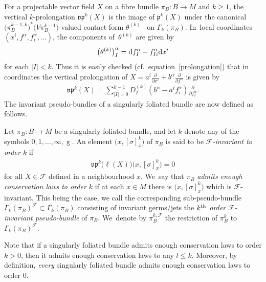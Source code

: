 \documentclass[pdftex]{sigma}
\numberwithin{equation}{section}
\def\g{\operatorname{g}}
\def\FF{{\mathcal{F}}}
\def\pf{{\mathfrak{p}}}
\def\vpf{{\mathfrak{vp}}}
\begin{document}
For a projectable vector field $X$ on a fibre bundle $\pi_{B}\colon B\rightarrow M$ and $k\geq1$, the vertical $k$-prolongation $\vpf^{k}(X)$ is the image of $\pf^{k}(X)$ under the canonical $\big(\pi_{B}^{k-1,k}\big)^{*}\big(V\pi_{B}^{k-1}\big)$-valued contact form $\theta^{(k)}$~\cite[Chapter~6.3]{saunders} on $\Gamma_{k}(\pi_{B})$. In~local coordinates $(x^{i},f^{\alpha},f^{\alpha}_{i},\dots)$, the components of~$\theta^{(k)}$ are given by
\begin{gather*}
\big(\theta^{(k)}\big)^{\alpha}_{I} = {\rm d}f^{\alpha}_{I} - f^{\alpha}_{Ii}{\rm d}x^{i}
\end{gather*}
for each $|I|<k$. Thus it is easily checked (cf.~equation~\eqref{prolongation}) that in coordinates the vertical prolongation of $X = a^{i}\frac{\partial}{\partial x^{i}}+b^{\alpha}\frac{\partial}{\partial f^{\alpha}}$ is given by
\begin{gather*}
\vpf^{k}(X) = \sum_{|I|=0}^{k-1}D_{I}^{(k)}(b^{\alpha}-a^{i}f^{\alpha}_{i})\frac{\partial}{\partial f^{\alpha}_{I}}.
\end{gather*}
The invariant pseudo-bundles of a singularly foliated bundle are now defined as follows.

\begin{Definition}\label{FFinv}
Let $\pi_{B}\colon B\rightarrow M$ be a singularly foliated bundle, and let $k$ denote any of the symbols $0,1,\dots,\infty,\g$. An element $\big(x,[\sigma]^{k}_{x}\big)$ of $\pi_{B}$ is said to be \textit{$\FF$-invariant to order $k$} if
\begin{gather*}
\vpf^{k}\big(\ell(X)\big)\big(x,[\sigma]^{k}_{x}\big) = 0
\end{gather*}
for all $X\in\FF$ defined in a neighbourhood $x$. We~say that $\pi_{B}$ \textit{admits enough conservation laws to order $k$} if at each $x\in M$ there is $\big(x,[\sigma]^{k}_{x}\big)$ which is $\FF$-invariant. This being the case, we call the corresponding sub-pseudo-bundle $\Gamma_{k}(\pi_{B})^{\FF}\subset\Gamma_{k}(\pi_{B})$ consisting of invariant germs/jets the \textit{$k^{\rm th}$ order $\FF$-invariant pseudo-bundle} of $\pi_{B}$. We~denote by $\pi_{B}^{k,\FF}$ the restriction of $\pi_{B}^{k}$ to $\Gamma_{k}(\pi_{B})^{\FF}$.
\end{Definition}

Note that if a singularly foliated bundle admits enough conservation laws to order $k>0$, then it admits enough conservation laws to any $l\leq k$. Moreover, by definition, \textit{every} singularly foliated bundle admits enough conservation laws to order 0.
\end{document}
